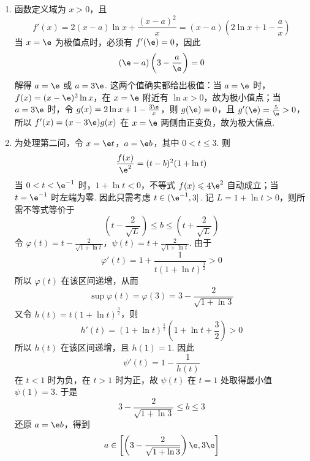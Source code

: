 \begin{solution}
\begin{enumerate}
\item
函数定义域为 \(x>0\)，且
\[
f'(x)=2(x-a)\ln x+\frac{(x-a)^2}{x}=(x-a)\left(2\ln x+1-\frac{a}{x}\right)
\]
当 \(x=\e\) 为极值点时，必须有 \(f'(\e)=0\)，因此
\[
(\e-a)\left(3-\frac{a}{\e}\right)=0
\]
解得 \(a=\e\) 或 \(a=3\e\). 这两个值确实都给出极值：当 \(a=\e\) 时，\(f(x)=(x-\e)^2\ln x\)，在 \(x=\e\) 附近有 \(\ln x>0\)，故为极小值点；当 \(a=3\e\) 时，令 \(g(x)=2\ln x+1-\frac{3\e}{x}\)，则 \(g(\e)=0\)，且 \(g'(\e)=\frac{5}{\e}>0\)，所以 \(f'(x)=(x-3\e)g(x)\) 在 \(x=\e\) 两侧由正变负，故为极大值点.

\item
为处理第二问，令 \(x=\e t\)，\(a=\e b\)，其中 \(0<t\leqslant3\). 则
\[
\frac{f(x)}{\e^2}=(t-b)^2(1+\ln t)
\]
当 \(0<t<\e^{-1}\) 时，\(1+\ln t<0\)，不等式 \(f(x)\leqslant4\e^2\) 自动成立；当 \(t=\e^{-1}\) 时左端为零. 因此只需考虑 \(t\in(\e^{-1},3]\). 记 \(L=1+\ln t>0\)，则所需不等式等价于
\[
\left(t-\frac{2}{\sqrt L}\right)\leqslant b\leqslant\left(t+\frac{2}{\sqrt L}\right)
\]
令 \(\varphi(t)=t-\frac{2}{\sqrt{1+\ln t}}\)，\(\psi(t)=t+\frac{2}{\sqrt{1+\ln t}}\). 由于
\[
\varphi'(t)=1+\frac{1}{t(1+\ln t)^{\frac{3}{2}}}>0
\]
所以 \(\varphi(t)\) 在该区间递增，从而
\[
\sup\varphi(t)=\varphi(3)=3-\frac{2}{\sqrt{1+\ln3}}
\]
又令 \(h(t)=t(1+\ln t)^{\frac{3}{2}}\)，则
\[
h'(t)=(1+\ln t)^{\frac{1}{2}}\left(1+\ln t+\frac{3}{2}\right)>0
\]
所以 \(h(t)\) 在该区间递增，且 \(h(1)=1\). 因此
\[
\psi'(t)=1-\frac{1}{h(t)}
\]
在 \(t<1\) 时为负，在 \(t>1\) 时为正，故 \(\psi(t)\) 在 \(t=1\) 处取得最小值 \(\psi(1)=3\). 于是
\[
3-\frac{2}{\sqrt{1+\ln3}}\leqslant b\leqslant3
\]
还原 \(a=\e b\)，得到
\[
a\in\left[\left(3-\frac{2}{\sqrt{1+\ln3}}\right)\e,3\e\right]
\]
\end{enumerate}
\end{solution}

